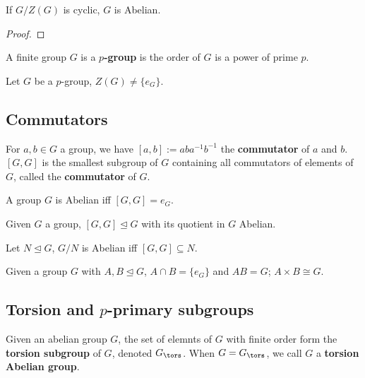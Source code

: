 \documentclass[../Year2.tex]{subfiles}
\begin{document}
\begin{theorem}
    If $G/Z(G)$ is cyclic, $G$ is Abelian.
    \begin{proof}
         
    \end{proof}
\end{theorem}

\begin{definition}[$p$-group]
    A finite group $G$ is a \textbf{$p$-group} is the order of $G$ is a power of prime $p$.
\end{definition}

\begin{theorem}
    Let $G$ be a $p$-group, $Z(G)\neq \{e_G\}$.
\end{theorem}

\subsection{Commutators}

\begin{definition}[Commutator]
    For $a,b\in G$ a group, we have $[a,b]:=aba^{-1}b^{-1}$ the \textbf{commutator} of $a$ and $b$. $[G,G]$ is the smallest subgroup of $G$ containing all commutators of elements of $G$, called the \textbf{commutator} of $G$.
\end{definition}

\begin{remark}
    A group $G$ is Abelian iff $[G,G]=e_G$.
\end{remark}

\begin{theorem}
    Given $G$ a group, $[G,G]\unlhd G$ with its quotient in $G$ Abelian.
\end{theorem}

\begin{theorem}
    Let $N\unlhd G$, $G/N$ is Abelian iff $[G,G]\subseteq N$.
\end{theorem}

\begin{theorem}
    Given a group $G$ with $A,B\unlhd G$, $A\cap B=\{e_G\}$ and $AB=G$; $A\times B\cong G$.
\end{theorem}

\subsection{Torsion and $p$-primary subgroups}

\begin{definition}
    Given an abelian group $G$, the set of elemnts of $G$ with finite order form the \textbf{torsion subgroup} of $G$, denoted $G_{\tors}$. When $G=G_{\tors}$, we call $G$ a \textbf{torsion Abelian group}.
\end{definition}
\end{document}

